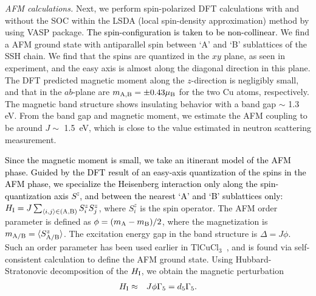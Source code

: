 \documentclass[aps,prl,showpacs,twocolumn,groupedaddress]{revtex4-1}
\newcommand{\TCC}{TlCuCl$_3$~}
\newcommand{\blue}{\textcolor{black}}
\begin{document}
{\it AFM calculations.} Next, we perform spin-polarized DFT calculations with and without the SOC within the LSDA (local spin-density approximation) method by using VASP package. \blue{The spin-configuration is taken to be non-collinear.} We find a AFM ground state with antiparallel spin between `A' and `B' sublattices of the SSH chain\cite{foot_pressure}. We find that the spins are quantized in the $xy$ plane, as seen in experiment\cite{pm1,pressure1,pressure2,mag1}, and the easy axis is almost along the diagonal direction in this plane. The DFT predicted magnetic moment along the $z$-direction is negligibly small, and that in the $ab$-plane are $m_{\rm A,B}=\pm 0.43\mu_{\rm B}$ for the two Cu atoms, respectively. The magnetic band structure shows insulating behavior with a band gap $\sim$ 1.3 eV.\cite{SM,foot_surface} From the band gap and magnetic moment, we estimate the AFM coupling to be around $J\sim$ 1.5~eV, which is close to the value estimated in neutron scattering measurement.\cite{ExpINSJ,ExpINSJ_2}

\blue{Since the magnetic moment is small, we take an itinerant model of the AFM phase. Guided by the DFT result of an easy-axis quantization of the spins in the AFM phase, we specialize the Heisenberg interaction only along the spin-quantization axis $S^{z}$, and between the nearest `A' and `B' sublattices only:} $H_{\rm I}=J\sum_{\Braket{i,j}\in{\rm (A,B)}}S^{z}_i S^{z}_j$, where $S^{z}_i$ is the spin operator. %
The AFM order parameter is defined as $\phi=(m_{\rm A}-m_{\rm B})/2$, where the magnetization is $m_{\rm A/B}=\langle{S^{z}_{\rm A/B}}\rangle$. The excitation energy gap in the band structure is $\Delta=J\phi$. Such an order parameter has been used earlier in \TCC, and is found via self-consistent calculation to define the AFM ground state.\cite{QMC} Using Hubbard-Stratonovic decomposition of the $H_{\rm I}$, we obtain the magnetic perturbation\cite{SM}
\begin{eqnarray}
H_{\rm I}&\approx &J\phi\Gamma_5=d_5\Gamma_5.
\label{Eq:HI}
\end{eqnarray}
\end{document}
